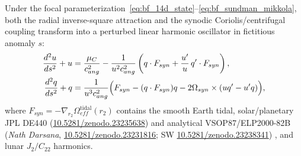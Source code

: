 \documentclass[11pt,a4paper,reqno]{article}
\def\bm#1{#1}%
\def\texttt#1{#1}%
\def\mathrm#1{#1}%
\def\mathcal#1{#1}%
\def\mathbb#1{#1}%
\newcommand{\zenodo}[1]{\href{https://doi.org/10.5281/zenodo.#1}{\texttt{10.5281/\allowbreak zenodo.#1}}}
\theoremstyle{plain}
\theoremstyle{definition}
\theoremstyle{remark}
\numberwithin{equation}{section}
\begin{document}
Under the focal parameterization~\eqref{eq:bf_14d_state}--\eqref{eq:bf_sundman_mikkola}, both the radial inverse-square attraction and the synodic Coriolis/centrifugal coupling transform into a perturbed linear harmonic oscillator in fictitious anomaly $s$:
\begin{align}
  \frac{\mathrm{d}^2 u}{\mathrm{d}s^2} + u &= \frac{\mu_{\mathbb{C}}}{c_{\mathrm{ang}}^2} - \frac{1}{u^2 c_{\mathrm{ang}}^2}\left( \bm{q} \cdot \bm{\mathcal{F}}_{\mathrm{syn}} + \frac{u'}{u}\,\bm{q}' \cdot \bm{\mathcal{F}}_{\mathrm{syn}} \right), \label{eq:bf_u_oscillator} \\
  \frac{\mathrm{d}^2 \bm{q}}{\mathrm{d}s^2} + \bm{q} &= \frac{1}{u^3 c_{\mathrm{ang}}^2}\Bigl( \bm{\mathcal{F}}_{\mathrm{syn}} - (\bm{q} \cdot \bm{\mathcal{F}}_{\mathrm{syn}})\bm{q} - 2\bm{\Omega}_{\mathrm{syn}} \times (u\bm{q}' - u'\bm{q}) \Bigr), \label{eq:bf_q_oscillator}
\end{align}
where $\bm{\mathcal{F}}_{\mathrm{syn}} = -\nabla_{\bm{r}_2}\Omega_{\mathrm{eff}}^{\text{tidal}}(\bm{r}_2)$ contains the smooth Earth tidal, solar/planetary JPL DE440 (\zenodo{23235638}) and analytical VSOP87/ELP2000-82B (\emph{Nath Darsana}, \zenodo{23231816}; SW \zenodo{23238341}) \cite{UnmaniNathDarsana2026}, and lunar $J_2/C_{22}$ harmonics.
\end{document}
